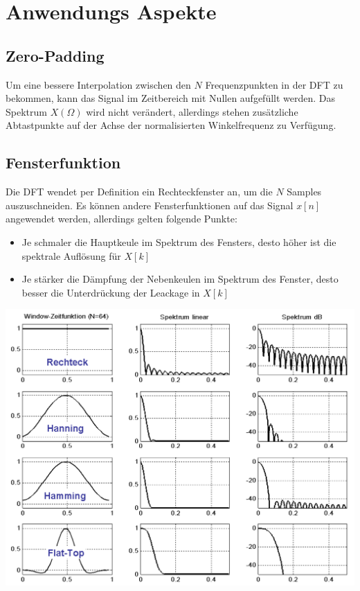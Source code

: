 \section{Anwendungs Aspekte}
\subsection{Zero-Padding}
Um eine bessere Interpolation zwischen den $N$ Frequenzpunkten in der DFT zu
bekommen, kann das Signal im Zeitbereich mit Nullen aufgefüllt werden.
Das Spektrum $X(\Omega)$ wird nicht verändert, allerdings stehen zusätzliche
Abtastpunkte auf der Achse der normalisierten Winkelfrequenz zu Verfügung.

\subsection{Fensterfunktion}
Die DFT wendet per Definition ein Rechteckfenster an, um die $N$ Samples
auszuschneiden. Es können andere Fensterfunktionen auf das Signal $x[n]$
angewendet werden, allerdings gelten folgende Punkte:
\begin{itemize}
	\item Je schmaler die Hauptkeule im Spektrum des Fensters, desto höher ist
	die spektrale Auflösung für $X[k]$
	\item Je stärker die Dämpfung der Nebenkeulen im Spektrum des Fenster, desto
	besser die Unterdrückung der Leackage in $X[k]$
\end{itemize}

\begin{center}
	\includegraphics[scale=.7]{../fig/windows}
\end{center}

